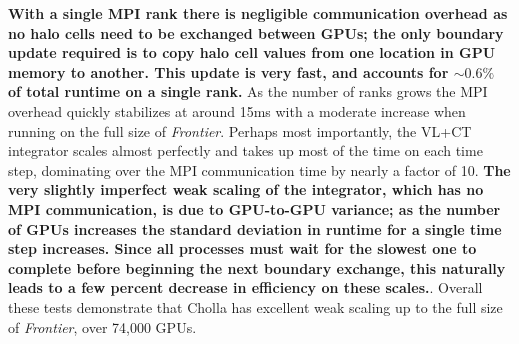 \documentclass[modern, linenumbers]{aastex631}
\begin{document}
\textbf{With a single MPI rank there is negligible communication overhead as no halo cells need to be exchanged between GPUs; the only boundary update required is to copy halo cell values from one location in GPU memory to another. This update is very fast, and accounts for $\sim 0.6\%$ of total runtime on a single rank.} As the number of ranks grows the MPI overhead quickly stabilizes at around 15ms with a moderate increase when running on the full size of \textit{Frontier}. Perhaps most importantly, the VL+CT integrator scales almost perfectly and takes up most of the time on each time step, dominating over the MPI communication time by nearly a factor of 10. \textbf{The very slightly imperfect weak scaling of the integrator, which has no MPI communication, is due to GPU-to-GPU variance; as the number of GPUs increases the standard deviation in runtime for a single time step increases. Since all processes must wait for the slowest one to complete before beginning the next boundary exchange, this naturally leads to a few percent decrease in efficiency on these scales.}. Overall these tests demonstrate that Cholla has excellent weak scaling up to the full size of \textit{Frontier}, over 74,000 GPUs.

\end{document}
